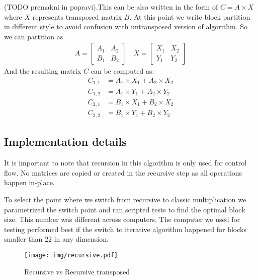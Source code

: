 \documentclass[a4paper,11pt]{article}
\begin{document}
(TODO premakni in popravi).This can be also written in the form of $C = A \times X$ where
$X$ represents transposed matrix $B$. 
At this point we write block partition in different style to avoid confusion with untransposed version of algorithm. 
So we can partition as
\begin{align*}
A = 
\begin{bmatrix}
A_{1} & A_{2} \\
B_{1} & B_{2}
\end{bmatrix}
\quad
X = 
\begin{bmatrix}
X_{1} & X_{2} \\
Y_{1} & Y_{2}
\end{bmatrix}
\end{align*}
And the resulting matrix $C$ can be computed as:
\begin{align*}
C_{1,1} &= A_{1} \times X_{1} + A_{2}  \times X_{2} \\
C_{1,2} &= A_{1} \times Y_{1} + A_{2}  \times Y_{2} \\
C_{2,1} &= B_{1} \times X_{1} + B_{2}  \times X_{2} \\
C_{2,2} &= B_{1} \times Y_{1} + B_{2}  \times Y_{2}
\end{align*}

\subsection{Implementation details} 
It is important to note that recursion in this algorithm is only used for control flow. No matrices are copied or created in the recursive step as all operations happen in-place. 

To select the point where we switch from recursive to classic multiplication we parametrized the switch point and ran scripted tests to find the optimal block size. This number was different across computers. The computer we used for testing performed best if the switch to iterative algorithm happened for blocks smaller than $22$ in any dimension.


\begin{figure}[h]
\centering
\texttt{[image: img/recursive.pdf]}
\caption{Recursive vs Recursive transposed}
\label{fig:recursive}
\end{figure}




\end{document}
